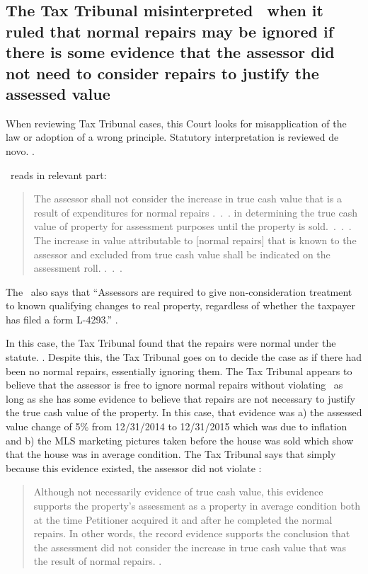 \documentclass[12pt,\documentclassflag]{michiganCourtOfAppealsBrief}
\begin{document}
\subsection{The Tax Tribunal misinterpreted \protect\mathieuGast\ when it ruled that normal repairs may be ignored if there is some evidence that the assessor did not need to consider repairs to justify the assessed value}

When reviewing Tax Tribunal cases, this Court looks for misapplication of the law or adoption of a wrong principle. Statutory interpretation is reviewed de novo. . 

\mathieuGast\ reads in relevant part:

\begin{quote}
The assessor shall not consider the increase in true cash value that is a result of expenditures for normal repairs .~.~. in determining the true cash value of property for assessment purposes until the property is sold.~.~.~. The increase in value attributable to [normal repairs] that is known to the assessor and excluded from true cash value shall be indicated on the assessment roll. .~.~.
\end{quote}

The \STC\ also says that ``Assessors are required to give non-consideration treatment to known qualifying changes to real property, regardless of whether the taxpayer has filed a form L-4293.'' .

In this case, the Tax Tribunal found that the repairs were normal under the statute. \foj[4]. Despite this, the Tax Tribunal goes on to decide the case as if there had been no normal repairs, essentially ignoring them. The Tax Tribunal appears to believe that the assessor is free to ignore normal repairs without violating \mathieuGast\ as long as she has some evidence to believe that repairs are not necessary to justify the true cash value of the property. In this case, that evidence was a) the assessed value change of 5\% from 12/31/2014 to 12/31/2015 which was due to inflation and b) the MLS marketing pictures taken before the house was sold which show that the house was in average condition. The Tax Tribunal says that simply because this evidence existed, the assessor did not violate \mathieuGast: 

\begin{quote}
	Although not necessarily evidence of true cash value, this evidence supports the property's assessment as a property in average condition both at the time Petitioner acquired it and after he completed the normal repairs. In other words, the record evidence supports the conclusion that the assessment did not consider the increase in true cash value that was the result of normal repairs. \reconsiderationDenied[2]. 
\end{quote}
 
\end{document}
